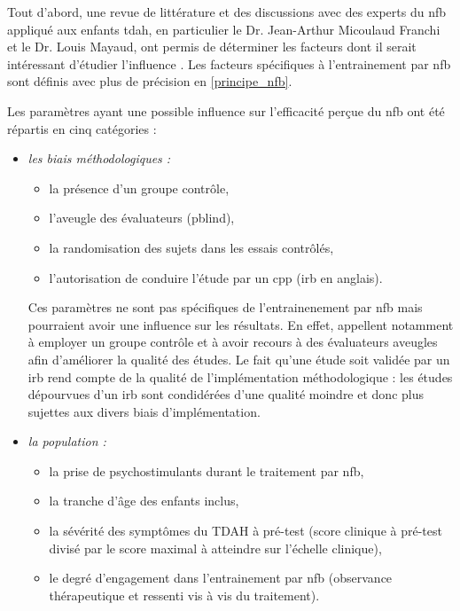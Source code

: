 Tout d'abord, une revue de littérature et des discussions avec des experts du \gls{nfb} appliqué aux enfants \gls{tdah}, en particulier le Dr. Jean-Arthur Micoulaud Franchi
et le Dr. Louis Mayaud, ont permis de déterminer les facteurs dont il serait intéressant d'étudier l'influence \citep{Vernon2004, Arns2009, Arns2014, 
*Cortese2016, Enriquez2017, Strehl2014}. Les facteurs 
spécifiques à l'entrainement par \gls{nfb} sont définis avec plus de précision en \ref{principe_nfb}.

Les paramètres ayant une possible influence sur l'efficacité perçue du \gls{nfb} ont été répartis en cinq catégories :
\renewcommand{\labelitemi}{$\bullet$}
\begin{itemize}
\item \emph{les biais méthodologiques :} 
    \begin{itemize} 
		\item la présence d'un groupe contrôle, 
		\item l'aveugle des évaluateurs (\gls{pblind}), 
		\item la randomisation des sujets dans les essais contrôlés,
		\item l'autorisation de conduire l'étude par un \gls{cpp} (\gls{irb} en anglais).
    \end{itemize}
Ces paramètres ne sont pas spécifiques de l'entrainenement par \gls{nfb} mais pourraient avoir une influence sur les résultats.
En effet, \citet{Ros2019} appellent notamment à employer un groupe contrôle et à avoir recours à des évaluateurs aveugles afin d'améliorer la qualité des études.
Le fait qu'une étude soit validée par un \gls{irb} rend compte de la qualité de l'implémentation méthodologique : les études dépourvues d'un \gls{irb} sont
condidérées d'une qualité moindre et donc plus sujettes aux divers biais d'implémentation.  
\item \emph{la population :} 
    \begin{itemize}
    \item la prise de psychostimulants durant le traitement par \gls{nfb}, 
		\item la tranche d'âge des enfants inclus, 
		\item la sévérité des symptômes du TDAH à pré-test (score clinique à pré-test divisé par le score maximal à atteindre sur l'échelle clinique), 
		\item le degré d'engagement dans l'entrainement par \gls{nfb} (observance thérapeutique et ressenti vis à vis du traitement).
    \end{itemize}

\end{itemize}
